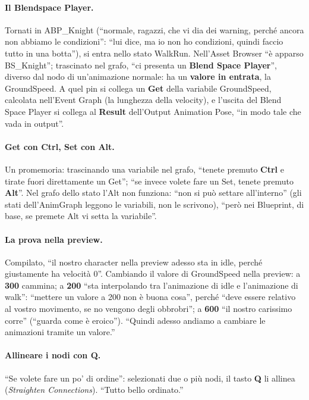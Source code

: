 \paragraph{Il Blendspace Player.} Tornati in ABP\_Knight (``normale, ragazzi, che vi dia
dei warning, perché ancora non abbiamo le condizioni'': ``lui dice, ma io non ho
condizioni, quindi faccio tutto in una botta''), si entra nello stato WalkRun. Nell'Asset
Browser ``è apparso BS\_Knight''; trascinato nel grafo, ``ci presenta un \textbf{Blend
Space Player}'', diverso dal nodo di un'animazione normale: ha un \textbf{valore in
entrata}, la GroundSpeed. A quel pin si collega un \textbf{Get} della variabile
GroundSpeed, calcolata nell'Event Graph (la lunghezza della velocity), e l'uscita del
Blend Space Player si collega al \textbf{Result} dell'Output Animation Pose, ``in modo
tale che vada in output''.

\paragraph{Get con Ctrl, Set con Alt.} Un promemoria: trascinando una variabile nel
grafo, ``tenete premuto \textbf{Ctrl} e tirate fuori direttamente un Get''; ``se invece
volete fare un Set, tenete premuto \textbf{Alt}''. Nel grafo dello stato l'Alt non
funziona: ``non si può settare all'interno'' (gli stati dell'AnimGraph leggono le
variabili, non le scrivono), ``però nei Blueprint, di base, se premete Alt vi setta la
variabile''.

\paragraph{La prova nella preview.} Compilato, ``il nostro character nella preview adesso
sta in idle, perché giustamente ha velocità 0''. Cambiando il valore di GroundSpeed nella
preview: a \textbf{300} cammina; a \textbf{200} ``sta interpolando tra l'animazione di
idle e l'animazione di walk'': ``mettere un valore a 200 non è buona cosa'', perché
``deve essere relativo al vostro movimento, se no vengono degli obbrobri''; a
\textbf{600} ``il nostro carissimo corre'' (``guarda come è eroico''). ``Quindi adesso
andiamo a cambiare le animazioni tramite un valore.''

\paragraph{Allineare i nodi con Q.} ``Se volete fare un po' di ordine'': selezionati due
o più nodi, il tasto \textbf{Q} li allinea (\emph{Straighten Connections}). ``Tutto bello
ordinato.''


